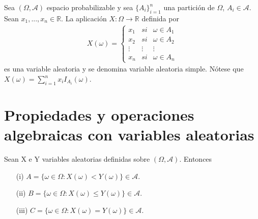 \begin{defi}
    Sea $(\Omega, \mathcal{A})$ espacio probabilizable y sea $\{A_i\}_{i=1}^{n}$ una partición de $\Omega$, $A_i \in \mathcal{A}$. Sean $x_1,...,x_n \in \mathbb{R}$. La aplicación $X: \Omega \longrightarrow \mathbb{R}$ definida por
    \begin{align*}
        X(\omega) = \left\{ \begin{array}{lcc}
                                x_1    & si     & \omega \in A_1  \\
                                x_2    & si     & \omega  \in A_2 \\
                                \vdots & \vdots & \vdots          \\
                                x_n    & si     & \omega  \in A_n
                            \end{array}
        \right.
    \end{align*}
    es una variable aleatoria y se denomina variable aleatoria simple. Nótese que $X(\omega) = \sum_{i=1}^{n}{x_iI_{A_i}(\omega)}$.
\end{defi}

\section{Propiedades y operaciones algebraicas con variables aleatorias}

\begin{teo}
    Sean X e Y variables aleatorias definidas sobre $(\Omega, \mathcal{A})$. Entonces
    \begin{enumerate}
        \item[(i)] $A = \{ \omega \in \Omega : X(\omega) < Y(\omega) \} \in \mathcal{A}$.
        \item[(ii)] $B = \{ \omega \in \Omega : X(\omega) \leq Y(\omega) \} \in \mathcal{A}$.
        \item[(iii)] $C = \{ \omega \in \Omega : X(\omega) = Y(\omega) \} \in \mathcal{A}$.
    \end{enumerate}
\end{teo}

